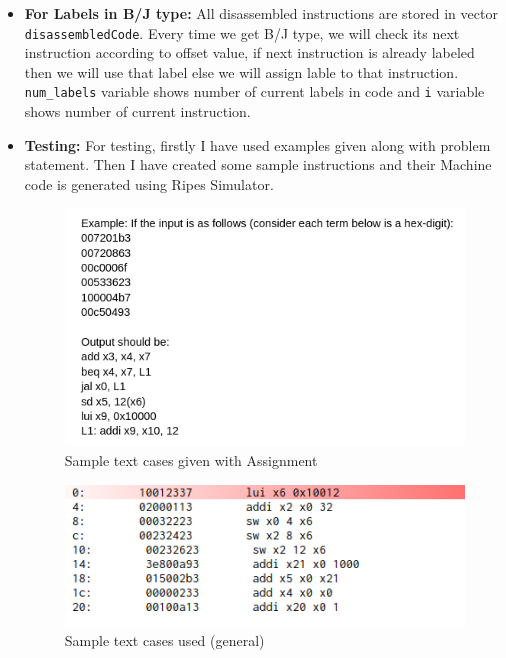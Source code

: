 \documentclass{article}
\begin{document}
\begin{itemize}
    \item \textbf{For Labels in B/J type:} All disassembled instructions are stored in vector \texttt{disassembledCode}. Every time we get B/J type, we will check its next instruction according to offset value, if next instruction is already labeled then we will use that label else we will assign lable to that instruction. 
    \texttt{num\_labels} variable shows number of current labels in code and \texttt{i} variable shows number of current instruction.

    \item \textbf{Testing:} For testing, firstly I have used examples given along with problem statement. Then I have created some sample instructions and their Machine code is generated using Ripes Simulator.
    
    \begin{figure}
        \includegraphics[width=\textwidth]{test1.png}
        \caption[short]{Sample text cases given with Assignment}
    \end{figure}
    \begin{figure}
        \includegraphics[width=\textwidth]{test2.png}
        \caption[short]{Sample text cases used (general)}
    \end{figure}
    \begin{figure}

\end{figure}
\end{itemize}
\end{document}
